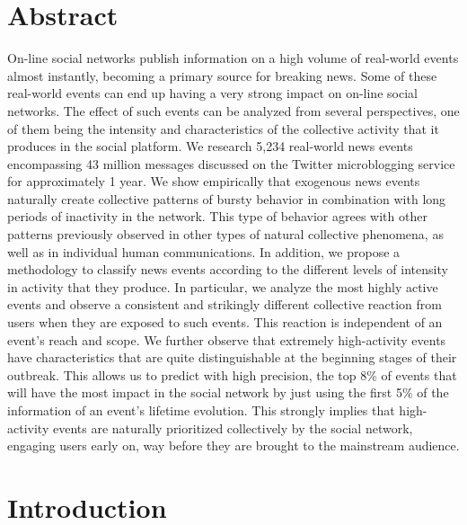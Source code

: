 \section*{Abstract}


On-line social networks publish information on a high volume of real-world
events almost instantly, becoming a primary source for breaking news.  
%
Some of these real-world events can end up having a very strong impact on
on-line social networks.  
%
The effect of such events can be analyzed from several perspectives, one of them
being the intensity and characteristics of the collective activity that it
produces in the social platform. 
%
We research 5,234 real-world news events encompassing 43 million messages
discussed on the Twitter microblogging service for approximately 1 year.  
%
We show empirically that exogenous news events naturally create collective
patterns of bursty behavior in combination with long periods of inactivity in
the network. 
%
This type of behavior agrees with other patterns previously observed in other
types of natural collective phenomena, as well as in individual human
communications. 
%
In addition, we propose a methodology to classify news events according to the
different levels of intensity in activity that they produce. 
%
In particular, we analyze the most highly active events and observe a consistent
and strikingly different collective reaction from users when they are exposed to
such events. 
%
This reaction is independent of an event's reach and scope.  
%
We further observe that extremely high-activity events have characteristics that
are quite distinguishable at the beginning stages of their outbreak.  
%
This allows us to predict with high precision, the top 8\% of events that will
have the most impact in the social network by just using the first 5\% of the
information of an event's lifetime evolution. 
%
This strongly implies that high-activity events are naturally prioritized
collectively by the social network, engaging users early on, way before they are
brought to the mainstream audience.


\section*{Introduction}


